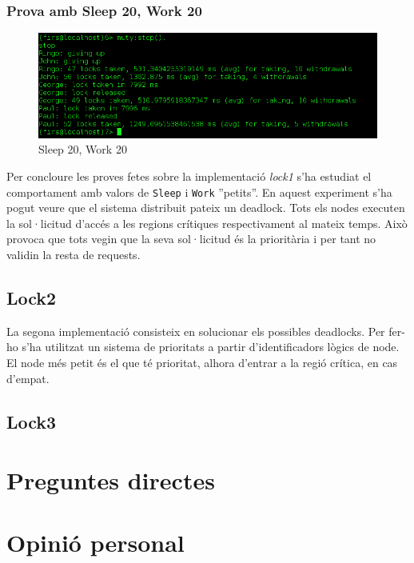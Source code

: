 \documentclass[a4paper, 11pt]{article}
\begin{document}
\subsubsection{Prova amb Sleep 20, Work 20}

\begin{figure}[H]
	\centering
    \includegraphics[width=1.0\textwidth]{figures/20-20lock1}
    \caption{Sleep 20, Work 20 \label{fig:20-20lock1}}    
\end{figure}

Per concloure les proves fetes sobre la implementació \textit{lock1} s'ha estudiat el comportament amb valors de \texttt{Sleep} i \texttt{Work} ''petits''. 
En aquest experiment s'ha pogut veure que el sistema distribuit pateix un deadlock. Tots els nodes executen la sol·licitud d'accés a les regions crítiques respectivament al mateix temps. Això provoca que tots vegin que la seva sol·licitud és la prioritària i per tant no validin la resta de requests.

\subsection{Lock2}

La segona implementació consisteix en solucionar els possibles deadlocks. Per fer-ho s'ha utilitzat un sistema de prioritats a partir d'identificadors lògics de node. El node més petit és el que té prioritat, alhora d'entrar a la regió crítica, en cas d'empat. 

\subsection{Lock3}

\section{Preguntes directes}


\section{Opinió personal}
\end{document}

